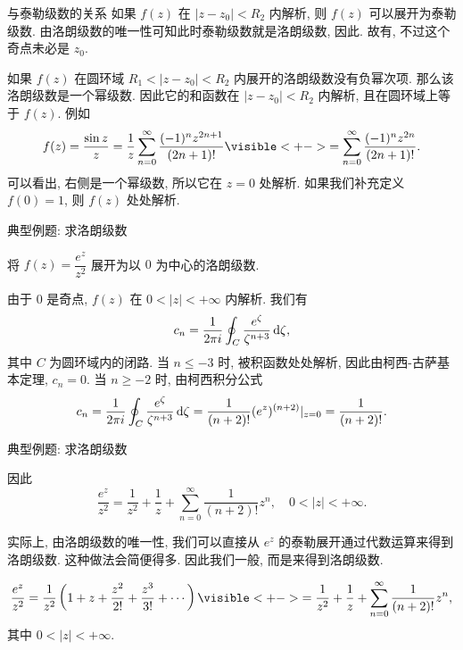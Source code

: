 \begin{frame}{与泰勒级数的关系}
\onslide<+->
如果 $f(z)$ 在 $|z-z_0|<R_2$ 内解析,
\onslide<+->
则 $f(z)$ 可以展开为泰勒级数.
\onslide<+->
由洛朗级数的唯一性可知此时泰勒级数就是洛朗级数,
\onslide<+->
因此.
\onslide<+->
故有, 不过这个奇点未必是 $z_0$.

\onslide<+->
如果 $f(z)$ 在圆环域 $R_1<|z-z_0|<R_2$ 内展开的洛朗级数没有负幂次项.
\onslide<+->
那么该洛朗级数是一个幂级数.
\onslide<+->
因此它的和函数在 $|z-z_0|<R_2$ 内解析, 且在圆环域上等于 $f(z)$.
\onslide<+->
例如
\[f(z)=\frac{\sin z}z=\frac 1z\sum_{n=0}^\infty\frac{(-1)^nz^{2n+1}}{(2n+1)!}
\visible<+->{=\sum_{n=0}^\infty\frac{(-1)^nz^{2n}}{(2n+1)!}.}\]
\onslide<+->
可以看出, 右侧是一个幂级数, 所以它在 $z=0$ 处解析.
\onslide<+->
如果我们补充定义 $f(0)=1$, 则 $f(z)$ 处处解析.
\end{frame}


\begin{frame}{典型例题: 求洛朗级数}
\beqskip{9pt}
\begin{example}
将 $f(z)=\dfrac{e^z}{z^2}$ 展开为以 $0$ 为中心的洛朗级数.
\end{example}
\begin{solution}
由于 $0$ 是奇点, $f(z)$ 在 $0<|z|<+\infty$ 内解析.
\onslide<+->
我们有
\[c_n=\frac1{2\pi i}\oint_C\frac{e^\zeta}{\zeta^{n+3}}\,\mathrm{d}\zeta,\]
其中 $C$ 为圆环域内的闭路.
\onslide<+->
当 $n\le -3$ 时, 被积函数处处解析, 因此由柯西-古萨基本定理, $c_n=0$.
\onslide<+->
当 $n\ge -2$ 时, 由柯西积分公式
\[c_n=\frac1{2\pi i}\oint_C\frac{e^\zeta}{\zeta^{n+3}}\,\mathrm{d}\zeta
=\frac1{(n+2)!}(e^z)^{(n+2)}|_{z=0}=\frac1{(n+2)!}.\]
\end{solution}
\endgroup
\end{frame}


\begin{frame}{典型例题: 求洛朗级数}
\begin{solutionc}
因此
\vspace{-\baselineskip}
\[\frac{e^z}{z^2}=\frac1{z^2}+\frac1z+\sum_{n=0}^\infty \frac1{(n+2)!}z^n,\quad 0<|z|<+\infty.\]
\end{solutionc}
\onslide<+->
实际上, 由洛朗级数的唯一性, 我们可以直接从 $e^z$ 的泰勒展开通过代数运算来得到洛朗级数.
\onslide<+->
这种做法会简便得多.
\onslide<+->
因此我们一般, 而是来得到洛朗级数.
\begin{solution}[另解]
\vspace{-\baselineskip}
\[\frac{e^z}{z^2}=\frac1{z^2}\left(1+z+\frac{z^2}{2!}+\frac{z^3}{3!}+\cdots\right)
\visible<+->{=\frac1{z^2}+\frac1z+\sum_{n=0}^\infty \frac1{(n+2)!}z^n,}\]
其中 $0<|z|<+\infty$.
\end{solution}
\end{frame}


